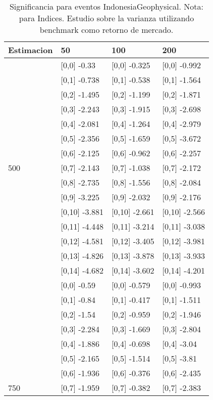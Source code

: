 \begin{table}

\caption{Significancia para eventos IndonesiaGeophysical. Nota: para Indices. Estudio sobre la varianza utilizando benchmark como retorno de mercado.}
\centering
\begin{tabular}[t]{llll}
\toprule
Estimacion & 50 & 100 & 200\\
\midrule
 & {}[0,0] -0.33 & {}[0,0] -0.325 & {}[0,0] -0.992\\
 & {}[0,1] -0.738 & {}[0,1] -0.538 & {}[0,1] -1.564\\
 & {}[0,2] -1.495 & {}[0,2] -1.199 & {}[0,2] -1.871\\
 & {}[0,3] -2.243 & {}[0,3] -1.915 & {}[0,3] -2.698\\
 & {}[0,4] -2.081 & {}[0,4] -1.264 & {}[0,4] -2.979\\
\addlinespace
 & {}[0,5] -2.356 & {}[0,5] -1.659 & {}[0,5] -3.672\\
 & {}[0,6] -2.125 & {}[0,6] -0.962 & {}[0,6] -2.257\\
500 & {}[0,7] -2.143 & {}[0,7] -1.038 & {}[0,7] -2.172\\
 & {}[0,8] -2.735 & {}[0,8] -1.556 & {}[0,8] -2.084\\
 & {}[0,9] -3.225 & {}[0,9] -2.032 & {}[0,9] -2.176\\
\addlinespace
 & {}[0,10] -3.881 & {}[0,10] -2.661 & {}[0,10] -2.566\\
 & {}[0,11] -4.448 & {}[0,11] -3.214 & {}[0,11] -3.038\\
 & {}[0,12] -4.581 & {}[0,12] -3.405 & {}[0,12] -3.981\\
 & {}[0,13] -4.826 & {}[0,13] -3.878 & {}[0,13] -3.933\\
 & {}[0,14] -4.682 & {}[0,14] -3.602 & {}[0,14] -4.201\\
\addlinespace
 & {}[0,0] -0.59 & {}[0,0] -0.579 & {}[0,0] -0.993\\
 & {}[0,1] -0.84 & {}[0,1] -0.417 & {}[0,1] -1.511\\
 & {}[0,2] -1.54 & {}[0,2] -0.959 & {}[0,2] -1.946\\
 & {}[0,3] -2.284 & {}[0,3] -1.669 & {}[0,3] -2.804\\
 & {}[0,4] -1.886 & {}[0,4] -0.698 & {}[0,4] -3.04\\
\addlinespace
 & {}[0,5] -2.165 & {}[0,5] -1.514 & {}[0,5] -3.81\\
 & {}[0,6] -1.936 & {}[0,6] -0.376 & {}[0,6] -2.435\\
750 & {}[0,7] -1.959 & {}[0,7] -0.382 & {}[0,7] -2.383\\

\end{tabular}
\end{table}
